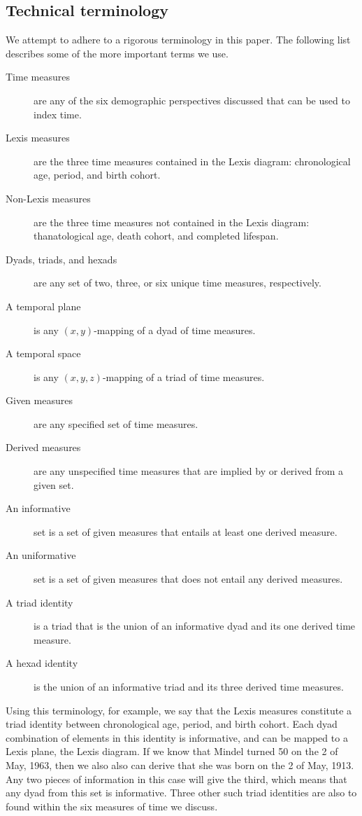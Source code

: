 \documentclass[11pt,oneside,a4paper]{article} %
\begin{document}
\subsection{Technical terminology}
We attempt to adhere to a rigorous terminology in this paper. The following list
describes some of the more important terms we use.
\begin{description}
\item[Time measures] are any of the six demographic perspectives discussed that
can be used to index time. 
\item[Lexis measures] are the three time measures contained in the Lexis
diagram:
chronological age, period, and birth cohort.
\item[Non-Lexis measures] are the three time measures not contained in the Lexis
diagram: thanatological age, death cohort, and completed lifespan.
\item[Dyads, triads, and hexads] are any set of two, three, or six unique time
measures, respectively.
\item[A temporal plane] is any $(x,y)$-mapping of a dyad of time measures.
\item[A temporal space] is any $(x,y,z)$-mapping of a triad of time
measures.
\item[Given measures] are any specified set of time measures.
\item[Derived measures] are any unspecified time measures that are implied by or
derived from a given set. 
\item[An informative] set is a set of given measures that entails at
least one derived measure.
\item[An uniformative] set is a set of given measures that does not entail any
derived measures.
\item[A triad identity] is a triad that is the union of an informative dyad and
its one derived time measure.
\item[A hexad identity] is the union of an informative triad and its three
derived time measures.
\end{description}
Using this terminology, for example, we say that the Lexis measures constitute a
triad identity between chronological age, period, and birth cohort. Each dyad
combination of elements in this identity is informative, and can be mapped to a
Lexis plane, the Lexis diagram. If we know that Mindel turned 50 on the 2
of May, 1963, then we also also can derive that she was born on the 2 of
May, 1913. Any two pieces of information in this case will give the third, which
means that any dyad from this set is informative. Three other such triad
identities are also to found within the six measures of time we discuss.
\FloatBarrier
\end{document}
